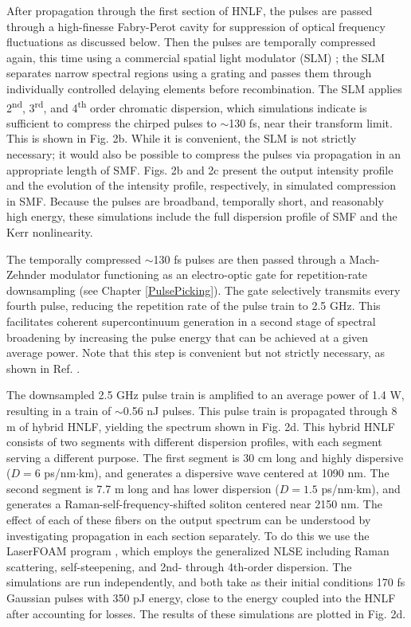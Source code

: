 After propagation through the first section of HNLF, the pulses are passed through a high-finesse Fabry-Perot cavity for suppression of optical frequency fluctuations as discussed below. Then the pulses are temporally compressed again, this time using a commercial spatial light modulator (SLM) \cite{Weiner2000}; the SLM separates narrow spectral regions using a grating and passes them through individually controlled delaying elements before recombination. The SLM applies 2\textsuperscript{nd}, 3\textsuperscript{rd}, and 4\textsuperscript{th} order chromatic dispersion, which simulations indicate is sufficient to compress the chirped pulses to $\sim$130 fs, near their transform limit. This is shown in Fig. 2b. While it is convenient, the SLM is not strictly necessary; it would also be possible to compress the pulses via propagation in an appropriate length of SMF. Figs. 2b and 2c present the output intensity profile and the evolution of the intensity profile, respectively, in simulated compression in SMF. Because the pulses are broadband, temporally short, and reasonably high energy, these simulations include the full dispersion profile of SMF and the Kerr nonlinearity.



The temporally compressed $\sim$130 fs pulses are then passed through a Mach-Zehnder modulator functioning as an electro-optic gate for repetition-rate downsampling (see Chapter \ref{PulsePicking}). The gate selectively transmits every fourth pulse, reducing the repetition rate of the pulse train to 2.5 GHz. This facilitates coherent supercontinuum generation in a second stage of spectral broadening by increasing the pulse energy that can be achieved at a given average power. Note that this step is convenient but not strictly necessary, as shown in Ref. \cite{Beha2017}. 

The downsampled 2.5 GHz pulse train is amplified to an average power of 1.4 W, resulting in a train of $\sim$0.56 nJ pulses. This pulse train is propagated through 8 m of hybrid HNLF, yielding the spectrum shown in Fig. 2d. This hybrid HNLF consists of two segments with different dispersion profiles, with each segment serving a different purpose. The first segment is 30 cm long and highly dispersive ($D=6$  ps/nm$\cdot$km), and generates a dispersive wave centered at 1090 nm. The second segment is 7.7 m long and has lower dispersion ($D=1.5$  ps/nm$\cdot$km), and generates a Raman-self-frequency-shifted soliton centered near 2150 nm. The effect of each of these fibers on the output spectrum can be understood by investigating propagation in each section separately. To do this we use the LaserFOAM program \cite{Amorim2009}, which employs the generalized NLSE including Raman scattering, self-steepening, and 2nd- through 4th-order dispersion. The simulations are run independently, and both take as their initial conditions 170 fs Gaussian pulses with 350 pJ energy, close to the energy coupled into the HNLF after accounting for losses. The results of these simulations are plotted in Fig. 2d. 

